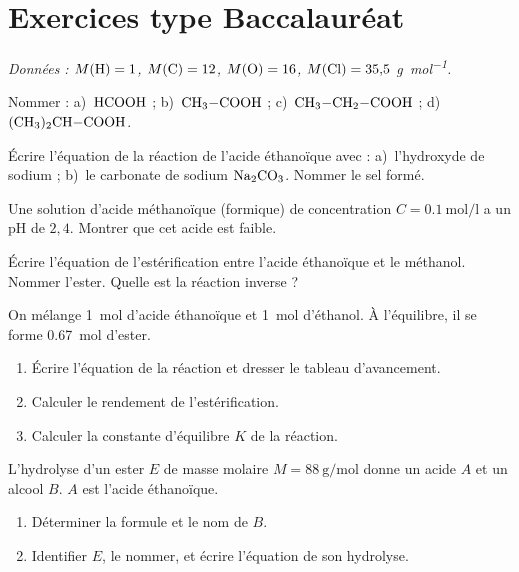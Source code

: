 \section{Exercices type Baccalauréat}
\textit{Données : $M(\ce{H})=1$, $M(\ce{C})=12$, $M(\ce{O})=16$, $M(\ce{Cl})=35{,}5$
\si{\gram\per\mol}.}


\exo{} Nommer : a)~$\ce{HCOOH}$ ; b)~$\ce{CH3-COOH}$ ;
c)~$\ce{CH3-CH2-COOH}$ ; d)~$\ce{(CH3)2CH-COOH}$.

\exo{} Écrire l'équation de la réaction de l'acide éthanoïque avec :
a)~l'hydroxyde de sodium ; b)~le carbonate de sodium $\ce{Na2CO3}$. Nommer le sel formé.

\exo{} Une solution d'acide méthanoïque (formique) de concentration
$C = \SI{0.1}{\mol\per\litre}$ a un pH de $2{,}4$. Montrer que cet acide est faible.


\exo{} Écrire l'équation de l'estérification entre l'acide éthanoïque et le
méthanol. Nommer l'ester. Quelle est la réaction inverse ?

\exo{} On mélange \SI{1}{\mol} d'acide éthanoïque et \SI{1}{\mol} d'éthanol.
À l'équilibre, il se forme \SI{0.67}{\mol} d'ester.
\begin{enumerate}[label=\arabic*)]
\item Écrire l'équation de la réaction et dresser le tableau d'avancement.
\item Calculer le rendement de l'estérification.
\item Calculer la constante d'équilibre $K$ de la réaction.
\end{enumerate}

\exo{} L'hydrolyse d'un ester $E$ de masse molaire $M = \SI{88}{\gram\per\mol}$
donne un acide $A$ et un alcool $B$. $A$ est l'acide éthanoïque.
\begin{enumerate}[label=\arabic*)]
\item Déterminer la formule et le nom de $B$.
\item Identifier $E$, le nommer, et écrire l'équation de son hydrolyse.
\end{enumerate}



